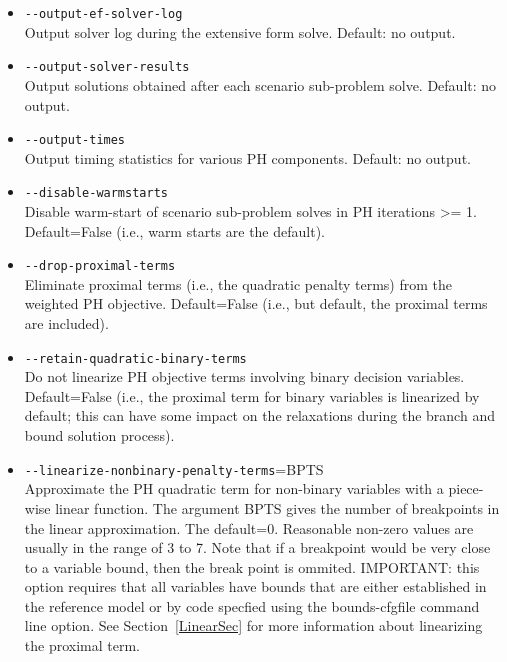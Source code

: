 \begin{itemize}
  \item \verb|--output-ef-solver-log|                                        \\
  Output solver log during the extensive form solve. Default: no output.

  \item \verb|--output-solver-results|                                       \\
  Output solutions obtained after each scenario sub-problem solve. Default: no
  output.

  \item \verb|--output-times|                                                \\
  Output timing statistics for various PH components. Default: no output.

  \item \verb|--disable-warmstarts|                                          \\
  Disable warm-start of scenario sub-problem solves in PH iterations >= 1.
  Default=False (i.e., warm starts are the default).

  \item \verb|--drop-proximal-terms|                                         \\
  Eliminate proximal terms (i.e., the quadratic penalty terms) from the weighted
  PH objective. Default=False (i.e., but default, the proximal terms are
  included).

  \item \verb|--retain-quadratic-binary-terms|                               \\
  Do not linearize PH objective terms involving binary decision variables.
  Default=False (i.e., the proximal term for binary variables is linearized by
  default; this can have some impact on the relaxations during the branch and
  bound solution process).

  \item \verb|--linearize-nonbinary-penalty-terms|=BPTS                      \\
  Approximate the PH quadratic term for non-binary variables with a piece-wise
  linear function. The argument BPTS gives the number of breakpoints in the
  linear approximation. The default=0. Reasonable non-zero values are usually in
  the range of 3 to 7. Note that if a breakpoint would be very close to a
  variable bound, then the break point is ommited. IMPORTANT: this option
  requires that all variables have bounds that are either established in the
  reference model or by code specfied using the bounds-cfgfile command line
  option. See Section~\ref{LinearSec} for more information about linearizing the
  proximal term.


\end{itemize}
